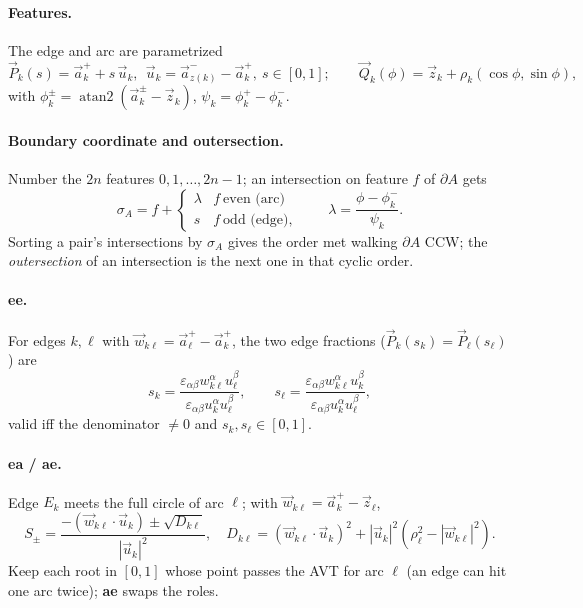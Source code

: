 \documentclass[11pt]{article}
\numberwithin{equation}{section}
\newcommand{\vv}[1]{\vec{#1}}
\DeclareMathOperator{\atantwo}{atan2}
\begin{document}
\paragraph{Features.} The edge and arc are parametrized
\begin{equation}
  \vv P_k(s)=\vv a^{+}_k+s\,\vv u_k,\ \ \vv u_k=\vv a^{-}_{z(k)}-\vv a^{+}_k,\ s\in[0,1];
  \qquad
  \vv Q_k(\phi)=\vv z_k+\rho_k(\cos\phi,\sin\phi),
\end{equation}
with $\phi^{\pm}_k=\atantwo(\vv a^{\pm}_k-\vv z_k)$, $\psi_k=\phi^{+}_k-\phi^{-}_k$.

\paragraph{Boundary coordinate and outersection.} Number the $2n$ features
$0,1,\dots,2n-1$; an intersection on feature $f$ of $\partial A$ gets
\begin{equation}
  \sigma_A=f+\begin{cases}\lambda & f\ \text{even (arc)}\\ s & f\ \text{odd (edge)},\end{cases}
  \qquad \lambda=\frac{\phi-\phi^{-}_k}{\psi_k}.
\end{equation}
Sorting a pair's intersections by $\sigma_A$ gives the order met walking $\partial A$ CCW; the
\emph{outersection} of an intersection is the next one in that cyclic order.

\paragraph{ee.} For edges $k,\ell$ with $\vv w_{k\ell}=\vv a^{+}_\ell-\vv a^{+}_k$, the two edge
fractions ($\vv P_k(s_k)=\vv P_\ell(s_\ell)$) are
\begin{equation}
  s_k=\frac{\varepsilon_{\alpha\beta}w_{k\ell}^{\alpha}u_\ell^{\beta}}{\varepsilon_{\alpha\beta}u_k^{\alpha}u_\ell^{\beta}},\qquad
  s_\ell=\frac{\varepsilon_{\alpha\beta}w_{k\ell}^{\alpha}u_k^{\beta}}{\varepsilon_{\alpha\beta}u_k^{\alpha}u_\ell^{\beta}},
\end{equation}
valid iff the denominator $\neq0$ and $s_k,s_\ell\in[0,1]$.

\paragraph{ea / ae.} Edge $E_k$ meets the full circle of arc $\ell$; with $\vv w_{k\ell}=\vv
a^{+}_k-\vv z_\ell$,
\begin{equation}
  S_{\pm}=\frac{-(\vv w_{k\ell}\!\cdot\!\vv u_k)\pm\sqrt{D_{k\ell}}}{|\vv u_k|^2},\quad
  D_{k\ell}=(\vv w_{k\ell}\!\cdot\!\vv u_k)^2+|\vv u_k|^2(\rho_\ell^2-|\vv w_{k\ell}|^2).
\end{equation}
Keep each root in $[0,1]$ whose point passes the AVT for arc $\ell$ (an edge can hit one arc
twice); \textbf{ae} swaps the roles.
\end{document}
